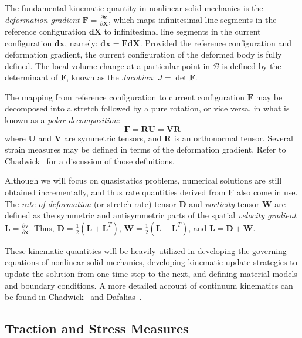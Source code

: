 The fundamental kinematic quantity in nonlinear solid mechanics is the \textit{deformation gradient} $\bm{F} = \frac{\partial \bm{x}}{\partial \bm{X}}$, which maps infinitesimal line segments in the reference configuration $\bm{dX}$ to infinitesimal line segments in the current configuration $\bm{dx}$, namely: $\bm{dx} = \bm{F}\bm{dX}$. Provided the reference configuration and deformation gradient, the current configuration of the deformed body is fully defined. The local volume change at a particular point in $\mathcal{B}$ is defined by the determinant of $\bm{F}$, known as the \textit{Jacobian}: $J = \det{\bm{F}}$.

The mapping from reference configuration to current configuration $\bm{F}$ may be decomposed into a  stretch followed by a pure rotation, or vice versa, in what is known as a \textit{polar decomposition}:
\begin{equation}
\bm{F} = \bm{R}\bm{U} = \bm{V}\bm{R}
\end{equation}
where $\bm{U}$ and $\bm{V}$ are symmetric tensors, and $\bm{R}$ is an orthonormal tensor. Several strain measures may be defined in terms of the deformation gradient. Refer to Chadwick~\cite{chadwick_1999} for a discussion of those definitions.

Although we will focus on quasistatics problems, numerical solutions are still obtained incrementally, and thus rate quantities derived from $\bm{F}$ also come in use. The \textit{rate of deformation} (or stretch rate) tensor $\bm{D}$ and \textit{vorticity} tensor $\bm{W}$ are defined as the symmetric and antisymmetric parts of the spatial \textit{velocity gradient} $\bm{L} = \frac{\partial \bm{v}}{\partial \bm{x}}$. Thus, $\bm{D} = \frac{1}{2}(\bm{L} + \bm{L}^T)$, $\bm{W} = \frac{1}{2}(\bm{L} - \bm{L}^T)$, and $\bm{L} = \bm{D} + \bm{W}$.

These kinematic quantities will be heavily utilized in developing the governing equations of nonlinear solid mechanics, developing kinematic update strategies to update the solution from one time step to the next, and defining material models and boundary conditions. A more detailed account of continuum kinematics can be found in Chadwick~\cite{chadwick_1999} and Dafalias~\cite{dafalias_205}.

\subsection{Traction and Stress Measures}


